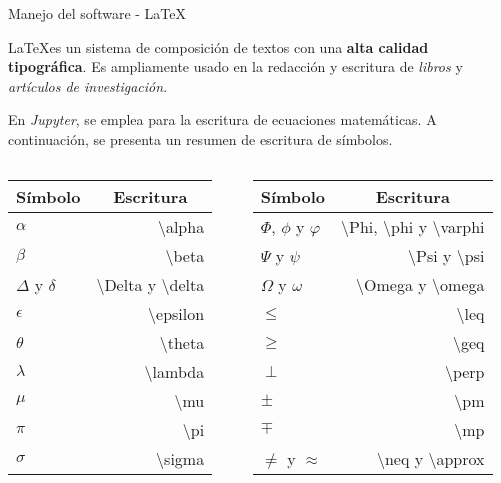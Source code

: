 \begin{frame}[t]{Manejo del software - \LaTeX}\vspace{0pt}

\LaTeX es un sistema de composici\'on de textos con una \textbf{alta calidad tipogr\'afica}. Es ampliamente usado en la redacci\'on y escritura de \textit{libros} y \textit{art\'iculos de investigaci\'on}.

\vspace{5pt}

En \textit{Jupyter}, se emplea para la escritura de ecuaciones matem\'aticas. A continuaci\'on, se presenta un resumen de escritura de s\'imbolos.

\begin{columns}
\begin{column}{0.5\textwidth}
\begin{table}[h!]
\begin{tabular}{|l|r|}
\hline
\multicolumn{1}{|c|}{\textbf{S\'imbolo}} & \multicolumn{1}{c|}{\textbf{Escritura}} \\ \hline
$\alpha$ & \textbackslash{}alpha \\ \hline
$\beta$ & \textbackslash{}beta \\ \hline
$\Delta$ y $\delta$ & \textbackslash{}Delta y \textbackslash{}delta \\ \hline
$\epsilon$ & \textbackslash{}epsilon \\ \hline
$\theta$ & \textbackslash{}theta \\ \hline
$\lambda$ & \textbackslash{}lambda \\ \hline
$\mu$ & \textbackslash{}mu \\ \hline
$\pi$ & \textbackslash{}pi \\ \hline
$\sigma$ & \textbackslash{}sigma \\ \hline

\end{tabular}
\end{table}
\end{column}
\begin{column}{0.5\textwidth}
\begin{table}[h!]
\begin{tabular}{|l|r|}
\hline
\multicolumn{1}{|c|}{\textbf{S\'imbolo}} & \multicolumn{1}{c|}{\textbf{Escritura}} \\ \hline
$\Phi$, $\phi$ y $\varphi$ & \textbackslash{}Phi, \textbackslash{}phi y \textbackslash{}varphi \\ \hline
$\Psi$ y $\psi$ & \textbackslash{}Psi y \textbackslash{}psi \\ \hline
$\Omega$ y $\omega$ & \textbackslash{}Omega y \textbackslash{}omega \\ \hline
$\leq$ & \textbackslash{}leq \\ \hline
$\geq$ & \textbackslash{}geq \\ \hline
$\perp$ & \textbackslash{}perp \\ \hline
$\pm$ & \textbackslash{}pm \\ \hline
$\mp$ & \textbackslash{}mp \\ \hline
$\neq$ y $\approx$ & \textbackslash{}neq y \textbackslash{}approx \\ \hline


\end{tabular}
\end{table}
\end{column}
\end{columns}
\end{frame}
